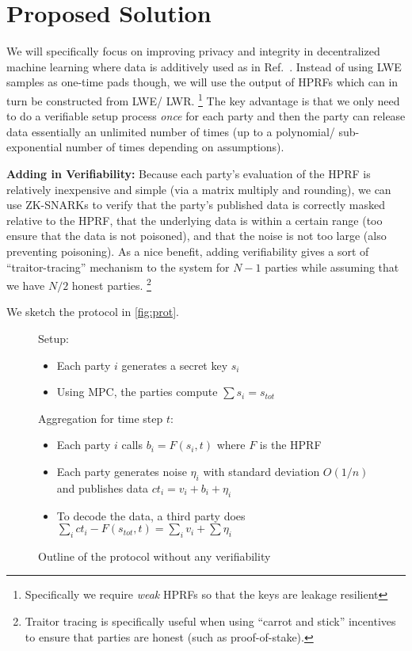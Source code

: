 \newcommand{\summedSK}{s_{tot}}

\section{Proposed Solution}
We will specifically focus on improving privacy and integrity in decentralized machine learning where data is additively used as in Ref.~\cite{stevens2021efficientdifferentiallyprivatesecure}.
Instead of using LWE samples as one-time pads though, we will use the output of HPRFs which can in turn be constructed from LWE/ LWR.
\footnote{Specifically we require \emph{weak} HPRFs so that the keys are leakage resilient}
The key advantage is that we only need to do a verifiable setup process \emph{once} for each party and then the party can release data essentially an unlimited number of times (up to a polynomial/ sub-exponential number of times depending on assumptions).

\textbf{Adding in Verifiability:} Because each party's evaluation of the HPRF is relatively inexpensive and simple (via a matrix multiply and rounding), we can use ZK-SNARKs to verify that the party's published data is correctly masked relative to the HPRF, that the underlying data is within a certain range (too ensure that the data is not poisoned), and that the noise is not too large (also preventing poisoning).
As a nice benefit, adding verifiability gives a sort of ``traitor-tracing'' mechanism to the system for $N - 1$ parties while assuming that we have $N /2$ honest parties.
\footnote{Traitor tracing is specifically useful when using ``carrot and stick'' incentives to ensure that parties are honest (such as proof-of-stake).}

We sketch the protocol in \cref{fig:prot}.

\begin{figure}[H]
	\begin{mdframed}
		Setup: \begin{itemize}
			\item Each party $i$ generates a secret key $s_i$
			\item Using MPC, the parties compute $\sum s_i = \summedSK$
		\end{itemize}
		Aggregation for time step $t$: \begin{itemize}
			\item Each party $i$ calls $b_i = F(s_i, t)$  where $F$ is the HPRF
			\item Each party generates noise $\eta_i$ with standard deviation $O(1/n)$ and publishes data $ct_i = v_i + b_i + \eta_i$ 
			\item To decode the data, a third party does $\sum_i ct_i - F(\summedSK, t) = \sum_i v_i + \sum \eta_i$
		\end{itemize}
	\end{mdframed}
	\caption{Outline of the protocol without any verifiability}
	\label{fig:protSimp}
\end{figure}

